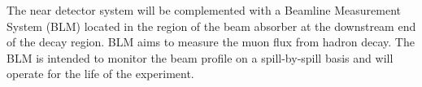 The near detector system will be complemented with a Beamline
Measurement System (BLM) located in the region of the beam absorber at
the downstream end of the decay region. BLM aims to measure the muon
flux from hadron decay.  The BLM is intended to monitor the beam
profile on a spill-by-spill basis and will operate for the life of
the experiment.
